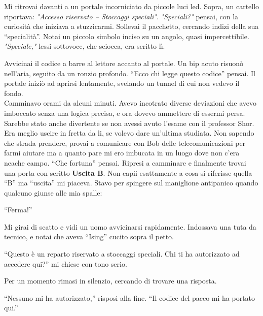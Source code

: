 Mi ritrovai davanti a un portale incorniciato da piccole luci led. Sopra, un cartello riportava: \textit{"Accesso riservato – Stoccaggi speciali"}. \emph{"Speciali?"} pensai, con la curiosità che iniziava a stuzzicarmi. Sollevai il pacchetto, cercando indizi della sua ``specialità''. Notai un piccolo simbolo inciso su un angolo, quasi impercettibile. \emph{"Speciale,"} lessi sottovoce, che sciocca, era scritto lì.

Avvicinai il codice a barre al lettore accanto al portale. Un bip acuto risuonò nell'aria, seguito da un ronzio profondo. ``Ecco chi legge questo codice'' pensai.  Il portale iniziò ad aprirsi lentamente, svelando un tunnel di cui non vedevo il fondo.\\
Camminavo orami da alcuni minuti. Avevo incotrato diverse deviazioni che avevo imboccato senza una logica precisa, e ora  dovevo ammettere di essermi persa. Sarebbe stato anche divertente se non avessi avuto l'esame con il professor Shor. Era meglio uscire in fretta da li, se volevo dare un'ultima studiata. Non sapendo che strada prendere,  provai a comunicare con Bob delle telecomunicazioni per farmi aiutare ma a quanto pare mi ero imbucata in un luogo dove non c'era neache campo. ``Che fortuna'' pensai. Ripresi a camminare e finalmente trovai una porta con scritto \textbf{Uscita B}. Non capii esattamente a cosa si riferisse quella ``B'' ma ``uscita'' mi piaceva. Stavo per spingere sul maniglione antipanico quando qualcuno giunse alle mia spalle:

\begin{dialogue}

   \enquote{Ferma!} 

 \end{dialogue}

 Mi girai di scatto e vidi un uomo avvicinarsi rapidamente. Indossava una tuta da tecnico, e notai che aveva \enquote{Ising} cucito sopra il petto.

 \begin{dialogue}
 \enquote{Questo è un reparto riservato a stoccaggi speciali. Chi ti ha autorizzato ad accedere qui?} mi chiese con tono serio.
\end{dialogue}
Per un momento rimasi in silenzio, cercando di trovare una risposta.
\begin{dialogue}
 \enquote{Nessuno mi ha autorizzato,} risposi alla fine. \enquote{Il codice del pacco mi ha portato qui.}
\end{dialogue}

